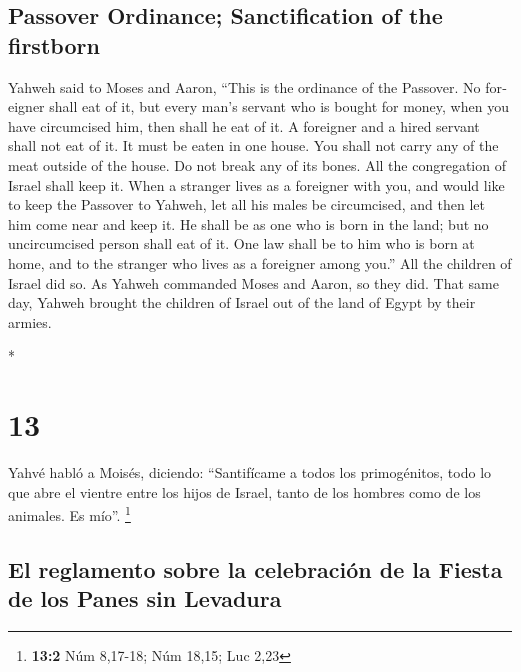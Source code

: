 \begin{paracol}{2}
\begin{otherlanguage}{english}
\hypertarget{passover-ordinance-sanctification-of-the-firstborn}{%
\subsection{Passover Ordinance; Sanctification of the
firstborn}\label{passover-ordinance-sanctification-of-the-firstborn}}

 Yahweh said to Moses and Aaron, ``This is the ordinance
of the Passover. No foreigner shall eat of it,  but every
man's servant who is bought for money, when you have circumcised him,
then shall he eat of it.  A foreigner and a hired servant
shall not eat of it.  It must be eaten in one house. You
shall not carry any of the meat outside of the house. Do not break any
of its bones.  All the congregation of Israel shall keep
it.  When a stranger lives as a foreigner with you, and
would like to keep the Passover to Yahweh, let all his males be
circumcised, and then let him come near and keep it. He shall be as one
who is born in the land; but no uncircumcised person shall eat of it.
 One law shall be to him who is born at home, and to the
stranger who lives as a foreigner among you.''  All the
children of Israel did so. As Yahweh commanded Moses and Aaron, so they
did.  That same day, Yahweh brought the children of
Israel out of the land of Egypt by their armies.

\end{otherlanguage}

\switchcolumn[0]*

\hypertarget{section-24}{%
\section{13}\label{section-24}}

 Yahvé habló a Moisés, diciendo: 
``Santifícame a todos los primogénitos, todo lo que abre el vientre
entre los hijos de Israel, tanto de los hombres como de los animales. Es
mío''. \footnote{\textbf{13:2} Núm 8,17-18; Núm 18,15; Luc 2,23}

\hypertarget{el-reglamento-sobre-la-celebraciuxf3n-de-la-fiesta-de-los-panes-sin-levadura}{%
\subsection{El reglamento sobre la celebración de la Fiesta de los Panes
sin
Levadura}\label{el-reglamento-sobre-la-celebraciuxf3n-de-la-fiesta-de-los-panes-sin-levadura}}


\end{paracol}
